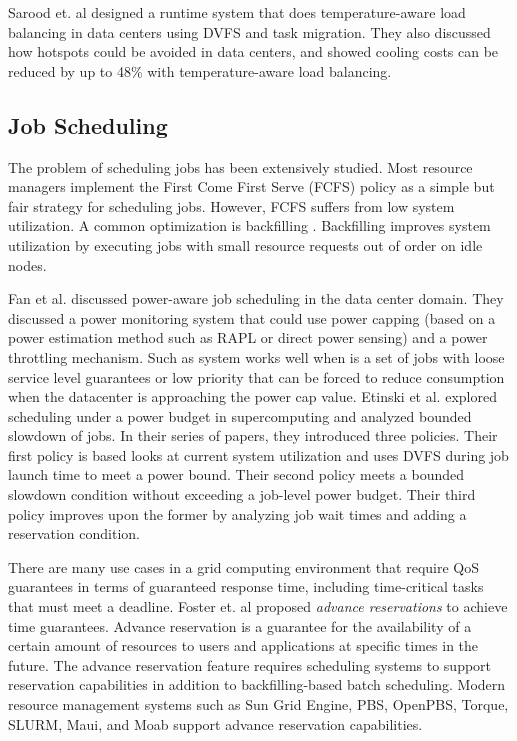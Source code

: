 Sarood et. al \cite{SaroodSC11} designed a runtime system that does temperature-aware load balancing in data centers using DVFS and task migration. They also discussed how hotspots could be avoided in data centers, and showed cooling costs can be reduced by up to 48\% with temperature-aware load balancing.

\subsection{Job Scheduling}
The problem of scheduling jobs has been extensively studied. Most resource managers implement the First Come First Serve (FCFS) policy
as a simple but fair strategy for scheduling jobs. However, FCFS suffers from low system utilization. A common optimization is backfilling
\cite{lifka_anl/ibm_1995,mualem_utilization_2001,feitelson_parallel_2004}. Backfilling improves system utilization by executing jobs with small resource requests out of order on idle nodes.

Fan et al. \cite{PowerAwareServer1} discussed power-aware job scheduling in the data center domain. 
They discussed a power monitoring system that could use power capping (based on a power estimation method such as RAPL or direct power sensing) and a power throttling mechanism. Such as system works well when is a set of jobs with loose service level guarantees or low priority that can be
forced to reduce consumption when the datacenter is approaching the power cap value. Etinski et al. \cite{Etinski1,Etinski2,Etinski3,Etinski4} explored scheduling under a power budget in supercomputing and analyzed bounded slowdown of jobs. In their series of papers, they introduced three policies. Their first policy is based looks at current system utilization and uses DVFS during job launch time to meet a power bound. Their second policy meets a bounded slowdown condition without exceeding a job-level power budget. Their third policy improves upon the former by analyzing job wait times and adding a reservation condition. 

There are many use cases in a grid computing environment that require QoS
guarantees in terms of guaranteed response time, including time-critical
tasks that must meet a deadline. Foster et. al \cite{foster_distributed_1999,foster_anatomy_2001} proposed \emph{advance reservations} to achieve time guarantees. Advance reservation is a guarantee for the availability of a certain amount of resources to users and applications at specific times in the future. The advance reservation feature requires scheduling systems to support reservation capabilities in addition to backfilling-based batch scheduling. Modern resource management systems such as Sun Grid Engine, PBS, OpenPBS, Torque, SLURM, Maui, and Moab support advance reservation capabilities.


